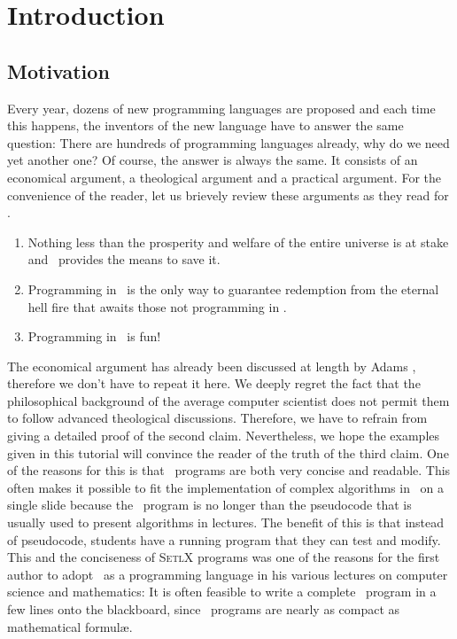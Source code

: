 \chapter{Introduction}

\section{Motivation}
Every year, dozens of new programming languages are proposed and each time this
happens,  the inventors of the new language have to answer the same question: 
There are hundreds of programming languages already, why do we need yet another one?  
Of course, the answer is always the same.  It consists of an economical argument, a
theological argument and a practical argument. For the
convenience of the reader, let us brievely review these arguments as they read for \setlx.  
\begin{enumerate}
\item Nothing less than the prosperity and welfare of the entire universe is at
      stake and \setlx\ provides the means to save it.
\item Programming in \setlx\ is the only way to guarantee redemption from 
      the eternal hell fire that awaits those not programming in \setlx.
\item Programming in \setlx\ is fun!
\end{enumerate}
The economical argument has already been discussed at length by Adams \cite{adams:1980},
therefore we don't have to repeat it here.   We deeply
regret the fact that the philosophical background of the average computer scientist does not permit
them to follow advanced theological discussions.  Therefore, we have to refrain from giving a
detailed proof of the second claim.  Nevertheless, we hope the examples given in this
tutorial will convince the reader of the truth of the third claim.
  One of the reasons for this is that \setlx\ programs are both very concise and
readable.  This often makes it possible to fit the implementation of complex algorithms in \setlx\ on a
single slide because the \setlx\ program is no longer than the pseudocode that is usually used to
present algorithms in lectures.  The benefit of this is that instead of pseudocode, students have a
running program that they can test and modify. This and the conciseness of \textsc{SetlX} programs was one of
the reasons for the first author to adopt \setlx\ as a programming language in his various lectures on computer 
science and mathematics: It is often feasible to write a complete \setlx\ program in a few lines 
onto the blackboard, since \setlx\ programs are nearly as compact as mathematical formul\ae.


